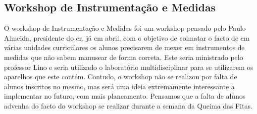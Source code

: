 
\subsection{Workshop de Instrumentação e Medidas}

O workshop de Instrumentação e Medidas foi um workshop pensado pelo Paulo Almeida, presidente do \acrshort{cr}, já em abril, com o objetivo de colmatar o facto de em várias unidades curriculares os alunos precisarem de mexer em instrumentos de medidas que não sabem manusear de forma correta. Este seria ministrado pelo professor Lino e seria utilizado o laboratório multidisciplinar para se utilizarem os aparelhos que este contém. Contudo, o workshop não se realizou por falta de alunos inscritos no mesmo, mas será uma ideia extremamente interessante a implementar no futuro, com mais planeamento. Pensamos que a falta de alunos advenha do facto do workshop se realizar durante a semana da Queima das Fitas.